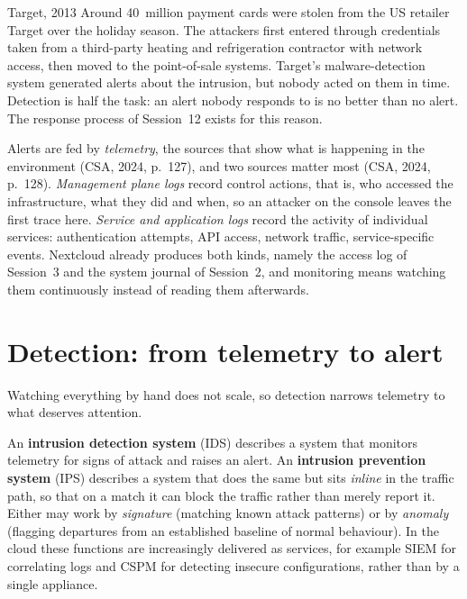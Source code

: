 \begin{realworld}{Target, 2013}
Around 40~million payment cards were stolen from the US retailer Target over
the holiday season. The attackers first entered through credentials taken
from a third-party heating and refrigeration contractor with network access,
then moved to the point-of-sale systems. Target's malware-detection system generated alerts about the intrusion, but
nobody acted on them in time. Detection is half the task: an alert nobody
responds to is no better than no alert. The response process of Session~12
exists for this reason.
\end{realworld}

Alerts are fed by \emph{telemetry}, the sources that show what is happening
in the environment (CSA, 2024, p.~127), and two sources matter most (CSA,
2024, p.~128). \emph{Management plane logs} record control actions, that is,
who accessed the infrastructure, what they did and when, so an attacker on
the console leaves the first trace here. \emph{Service and application logs}
record the activity of individual services: authentication attempts, API
access, network traffic, service-specific events. Nextcloud already produces
both kinds, namely the access log of Session~3 and the system journal of
Session~2, and monitoring means watching them continuously instead of
reading them afterwards.

\section{Detection: from telemetry to alert}

Watching everything by hand does not scale, so detection narrows telemetry
to what deserves attention.

\begin{definition}\label{def:ids}
An \textbf{intrusion detection system} (IDS) describes a system that monitors
telemetry for signs of attack and raises an alert. An \textbf{intrusion
prevention system} (IPS) describes a system that does the same but sits
\emph{inline} in the traffic path, so that on a match it can block the traffic
rather than merely report it. Either may work by \emph{signature} (matching
known attack patterns) or by \emph{anomaly} (flagging departures from an
established baseline of normal behaviour). In the cloud these functions are
increasingly delivered as services, for example SIEM for correlating logs and
CSPM for detecting insecure configurations, rather than by a single
appliance.
\end{definition}

